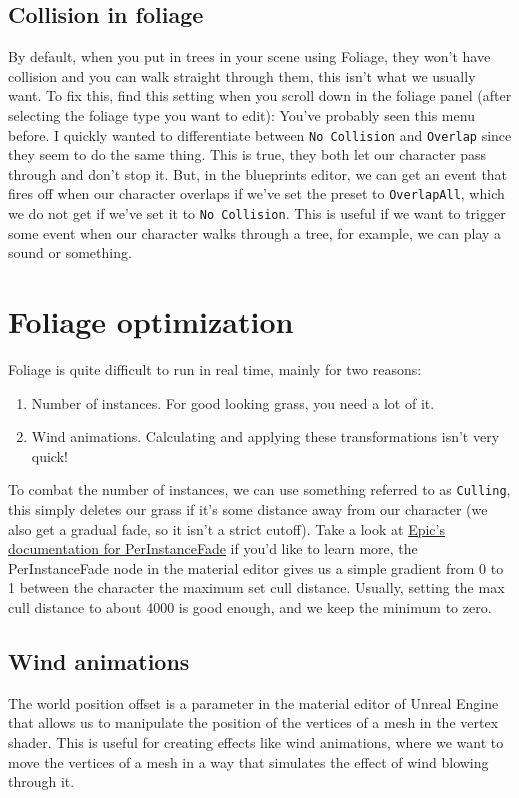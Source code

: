 \documentclass{article}
\begin{document}
	\subsection{Collision in foliage}
	By default, when you put in trees in your scene using Foliage, they won't have collision and you can walk straight through them, this isn't what we usually want. To fix this, find this setting when you scroll down in the foliage panel (after selecting the foliage type you want to edit):
	\newpage
	You've probably seen this menu before. I quickly wanted to differentiate between \verb|No Collision| and \verb|Overlap| since they seem to do the same thing. This is true, they both let our character pass through and don't stop it. But, in the blueprints editor, we can get an event that fires off when our character overlaps if we've set the preset to \verb|OverlapAll|, which we do not get if we've set it to \verb|No Collision|. This is useful if we want to trigger some event when our character walks through a tree, for example, we can play a sound or something.
	
	\section{Foliage optimization}
	Foliage is quite difficult to run in real time, mainly for two reasons:
	\begin{enumerate}
		\item Number of instances. For good looking grass, you need a lot of it.
		\item Wind animations. Calculating and applying these transformations isn't very quick!
	\end{enumerate}
	To combat the number of instances, we can use something referred to as \verb*|Culling|, this simply deletes our grass if it's some distance away from our character (we also get a gradual fade, so it isn't a strict cutoff). Take a look at \href{https://dev.epicgames.com/documentation/en-us/unreal-engine/foliage-mode-in-unreal-engine#culling-settings}{Epic's documentation for PerInstanceFade} if you'd like to learn more, the PerInstanceFade node in the material editor gives us a simple gradient from 0 to 1 between the character the maximum set cull distance. 
	Usually, setting the  max cull distance to about 4000 is good enough, and we keep the minimum to zero.
	\subsection{Wind animations}
	The world position offset is a parameter in the material editor of Unreal Engine that allows us to manipulate the position of the vertices of a mesh in the vertex shader. This is useful for creating effects like wind animations, where we want to move the vertices of a mesh in a way that simulates the effect of wind blowing through it.
\end{document}
